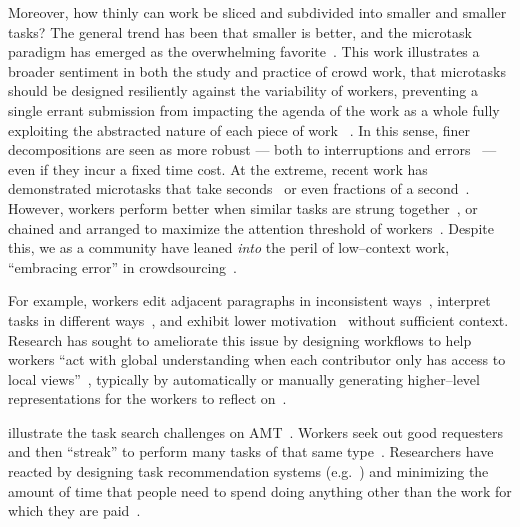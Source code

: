 \documentclass[trackingWork]{subfiles}
\begin{document}
Moreover,
how thinly can work be sliced and subdivided into smaller and smaller tasks? 
The general trend has been that smaller is better,
and the microtask paradigm has emerged as the overwhelming favorite~\cite{selfsourcingTeevan2014,selfsourcingTeevan2016}.
This work illustrates a broader sentiment in both the study and practice
of crowd work,
that microtasks should be designed resiliently against the variability of workers,
preventing a single errant submission from impacting the agenda of the work as a whole %
fully exploiting the abstracted nature of each piece of work
~\cite{interruptionIqbal,delayAndOrderLasecki,vaish2014low}.
In this sense,
finer decompositions are seen as more robust
--- both to interruptions and errors~\cite{cheng2015break} ---
even if they incur a fixed time cost.
At the extreme,
recent work has demonstrated
microtasks that take seconds~\cite{Vaish:2014:TCC:2611222.2556996,Cai:2015:WLW:2702123.2702267}
or even fractions of a second~\cite{embracingErrorKrishna}.
However,
workers perform better when similar tasks are strung together~\cite{delayAndOrderLasecki},
or
chained and arranged to maximize the attention threshold of workers~\cite{Cai:2016:CRI:2858036.2858237}.
Despite this,
we as a community have leaned \textit{into} the peril of
low--context work, ``embracing error'' in crowdsourcing~\cite{embracingErrorKrishna}.


For example,
workers edit adjacent paragraphs in inconsistent ways~\cite{bernsteinSoylent,Kim2017},
interpret tasks in different ways~\cite{kairam2016parting},
and exhibit lower motivation~\cite{Kinnaird:2012:WTM:2389176.2389219} without sufficient context.
Research has sought to ameliorate this issue by
designing workflows to help workers ``act with global understanding when
each contributor only has access to local views''~\cite{verroios2014context},
typically by automatically or manually generating higher--level representations
for the workers to reflect on~\cite{chilton2013cascade,verroios2014context,Kim2017}.

\citeauthor{taskSearch} illustrate the task search challenges on AMT~\cite{taskSearch}.
Workers seek out good requesters~\cite{martin2014being} and then 
``streak'' to perform many tasks of that same type~\cite{taskSearch}.
Researchers have reacted by designing task recommendation systems (e.g.~\cite{Cosley:2007:SUI:1216295.1216309})
and minimizing the amount of time that people need to spend doing anything other than
the work for which they are paid~\cite{callison2014crowd}.
\end{document}
